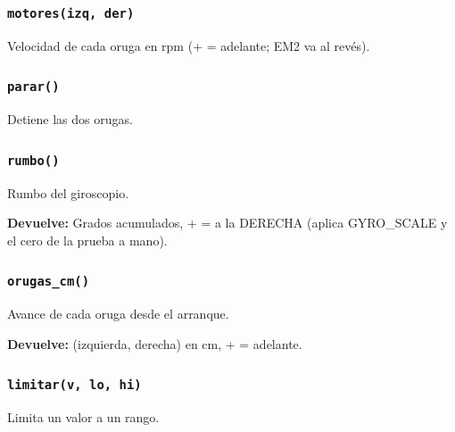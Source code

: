 \subsubsection{\texttt{motores(izq, der)}}\label{fn:calibrations:motores}
\noindent Velocidad de cada oruga en rpm (+ = adelante; EM2 va al revés).

\par{}\par\smallskip

\subsubsection{\texttt{parar()}}\label{fn:calibrations:parar}
\noindent Detiene las dos orugas.


\subsubsection{\texttt{rumbo()}}\label{fn:calibrations:rumbo}
\noindent Rumbo del giroscopio.

\noindent\textbf{Devuelve:} Grados acumulados, + = a la DERECHA (aplica GYRO\_SCALE y el cero de la prueba a mano).\par

\subsubsection{\texttt{orugas\_\allowbreak{}cm()}}\label{fn:calibrations:orugas-cm}
\noindent Avance de cada oruga desde el arranque.

\noindent\textbf{Devuelve:} (izquierda, derecha) en cm, + = adelante.\par

\subsubsection{\texttt{limitar(v, lo, hi)}}\label{fn:calibrations:limitar}
\noindent Limita un valor a un rango.

